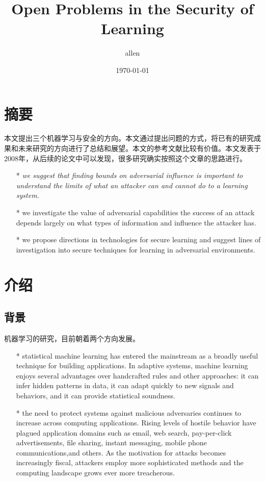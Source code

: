 \documentclass[UTF8]{ctexart}
\title{\heiti Open Problems in the Security of Learning}
\author{\kaishu allen}
\date{\today}
\begin{document}
    
    \maketitle

    \clearpage
    \section{摘要}\label{sec:diyijie}
  	本文提出三个机器学习与安全的方向。本文通过提出问题的方式，将已有的研究成果和未来研究的方向进行了总结和展望。本文的参考文献比较有价值。本文发表于2008年，从后续的论文中可以发现，很多研究确实按照这个文章的思路进行。
	\begin{itemize}
	\item[*] \textit{we suggest that finding bounds on adversarial influence is important to understand the limits of what an attacker can and cannot do to a learning system.}
	\item[*] we investigate the value of adversarial capabilities the success of an attack depends largely on what types of information and influence the attacker has.
	\item[*] we propose directions in technologies for secure learning and suggest lines of investigation into secure techniques for learning in adversarial environments.
	\end{itemize}
	\clearpage
    \section{介绍}\label{sec:dierjie}
    \subsection{背景}
        机器学习的研究，目前朝着两个方向发展。
	\begin{itemize}
	\item[*] statistical machine learning has entered the mainstream as a broadly useful technique for building applications. In adaptive systems, machine learning enjoys several advantages over handcrafted rules and other approaches: it can infer hidden patterns in data, it can adapt quickly to new signals and behaviors, and it can provide statistical soundness.
	\item[*]the need to protect systems against malicious adversaries continues to increase across computing applications. Rising levels of hostile behavior have plagued application domains such as email, web search, pay-per-click   advertisements, file sharing, instant messaging, mobile phone communications,and others. As the motivation for attacks becomes increasingly fiscal, attackers employ more sophisticated methods and the computing landscape grows ever more treacherous.
	\end{itemize}
	\clearpage
	
\end{document}
